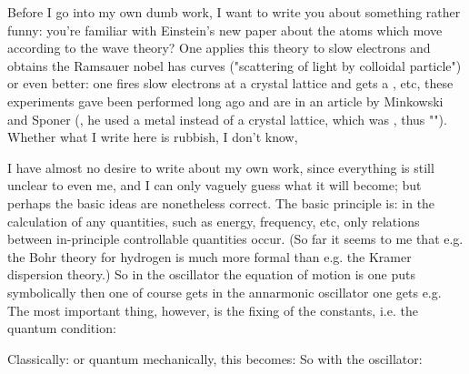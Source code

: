 
Before I go into my own dumb work, I want to write you about something rather funny: you're familiar with Einstein's new paper about the atoms which move according to the wave theory? One applies this theory to slow electrons and obtains the Ramsauer nobel has curves ("scattering of light by colloidal particle") or even better: one fires slow electrons at a crystal lattice and gets a , etc, these experiments gave been performed long ago and are in an article by Minkowski and Sponer (, he used a metal instead of a crystal lattice, which was , thus ""). Whether what I write here is rubbish, I don't know, 

I have almost no desire to write about my own work, since everything is still unclear to even me, and I can only vaguely guess what it will become; but perhaps the basic ideas are nonetheless correct. The basic principle is: in the calculation of any quantities, such as energy, frequency, etc, only relations between in-principle controllable quantities occur. (So far it seems to me that e.g. the Bohr theory for hydrogen is much more formal than e.g. the Kramer dispersion theory.) So in the oscillator the equation of motion is
one puts symbolically
then one of course gets
in the annarmonic oscillator one gets e.g.
The most important thing, however, is the fixing of the constants, i.e. the quantum condition:

Classically:
or
quantum mechanically, this becomes:
So with the oscillator:

